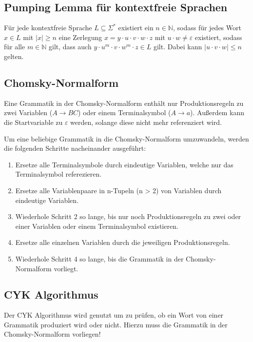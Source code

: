 \documentclass[a4paper, 11pt, accentcolor = tud3b]{tudreport}
\begin{document}
        \subsection{Pumping Lemma für kontextfreie Sprachen}
            Für jede kontextfreie Sprache $ L \subseteq \Sigma ^ * $ existiert ein $ n \in \mathbb{N} $, sodass für jedes Wort $ x \in L $ mit $ \vert x \vert \geq n $ eine Zerlegung $ x = y \cdot u \cdot v \cdot w \cdot z $ mit $ u \cdot w \neq \varepsilon $ existiert, sodass für alle $ m \in \mathbb{N} $ gilt, dass auch $ y \cdot u ^ m \cdot v \cdot w ^ m \cdot z \in L $ gilt. Dabei kann $ \vert u \cdot v \cdot w \vert \leq n $ gelten.



        \subsection{Chomsky-Normalform}
            Eine Grammatik in der Chomsky-Normalform enthält nur Produktionsregeln zu zwei Variablen ($ A \rightarrow BC $) oder einem Terminalsymbol ($ A \rightarrow a $). Außerdem kann die Startvariable zu $ \varepsilon $ werden, solange diese nicht mehr referenziert wird.

            Um eine beliebige Grammatik in die Chomsky-Normalform umzuwandeln, werden die folgenden Schritte nacheinander ausgeführt:
            \begin{enumerate}
                \item Ersetze alle Terminalsymbole durch eindeutige Variablen, welche nur das Terminalsymbol referezieren.
                \item Ersetze alle Variablenpaare in n-Tupeln (n > 2) von Variablen durch eindeutige Variablen.
                \item Wiederhole Schritt 2 so lange, bis nur noch Produktionsregeln zu zwei oder einer Variablen oder einem Terminalsymbol existieren.
                \item Ersetze alle einzelnen Variablen durch die jeweiligen Produktionsregeln.
                \item Wiederhole Schritt 4 so lange, bis die Grammatik in der Chomsky-Normalform vorliegt.
            \end{enumerate}


        \subsection{CYK Algorithmus}
            Der CYK Algorithmus wird genutzt um zu prüfen, ob ein Wort von einer Grammatik produziert wird oder nicht. Hierzu muss die Grammatik in der Chomsky-Normalform vorliegen!
\end{document}
